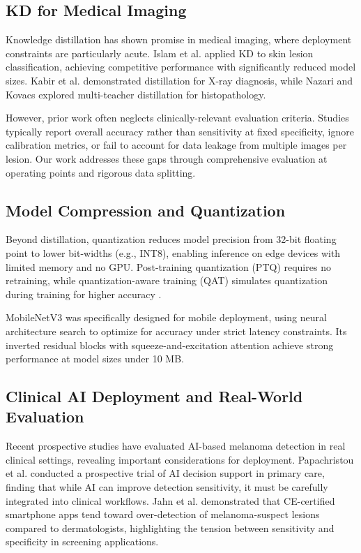 \documentclass[conference]{IEEEtran}
\begin{document}
\subsection{KD for Medical Imaging}

Knowledge distillation has shown promise in medical imaging, where deployment constraints are particularly acute. Islam et al. \cite{islam2022knowledge} applied KD to skin lesion classification, achieving competitive performance with significantly reduced model sizes. Kabir et al. \cite{kabir2021spinenet} demonstrated distillation for X-ray diagnosis, while Nazari and Kovacs \cite{nazari2023multi} explored multi-teacher distillation for histopathology.

However, prior work often neglects clinically-relevant evaluation criteria. Studies typically report overall accuracy rather than sensitivity at fixed specificity, ignore calibration metrics, or fail to account for data leakage from multiple images per lesion. Our work addresses these gaps through comprehensive evaluation at operating points and rigorous data splitting.

\subsection{Model Compression and Quantization}

Beyond distillation, quantization reduces model precision from 32-bit floating point to lower bit-widths (e.g., INT8), enabling inference on edge devices with limited memory and no GPU. Post-training quantization (PTQ) requires no retraining, while quantization-aware training (QAT) simulates quantization during training for higher accuracy \cite{polino2018model,gou2021knowledge}.

MobileNetV3 \cite{howard2019searching} was specifically designed for mobile deployment, using neural architecture search to optimize for accuracy under strict latency constraints. Its inverted residual blocks with squeeze-and-excitation attention achieve strong performance at model sizes under 10 MB.

\subsection{Clinical AI Deployment and Real-World Evaluation}

Recent prospective studies have evaluated AI-based melanoma detection in real clinical settings, revealing important considerations for deployment. Papachristou et al. \cite{papachristou2024evaluation} conducted a prospective trial of AI decision support in primary care, finding that while AI can improve detection sensitivity, it must be carefully integrated into clinical workflows. Jahn et al. \cite{jahn2022overdetection} demonstrated that CE-certified smartphone apps tend toward over-detection of melanoma-suspect lesions compared to dermatologists, highlighting the tension between sensitivity and specificity in screening applications.
\end{document}
